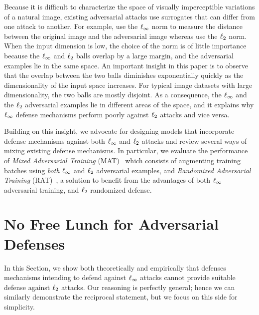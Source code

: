 Because it is difficult to characterize the space of visually imperceptible variations of a natural image, existing adversarial attacks use surrogates that can differ from one attack to another.
For example, \citet{goodfellow2014explaining} use the $\ell_\infty $ norm to measure the distance between the original image and the adversarial image whereas \citet{carlini2017towards} use the $\ell_2 $ norm.
When the input dimension is low, the choice of the norm is of little importance because the $\ell_\infty $ and $\ell_2 $ balls overlap by a large margin, and the adversarial examples lie in the same space.
An important insight in this paper is to observe that the overlap between the two balls  diminishes exponentially quickly as the dimensionality of the input space increases.
For typical image datasets with large dimensionality, the two balls are mostly disjoint.
As a consequence, the $\ell_\infty $ and the $\ell_2 $ adversarial examples lie in different areas of the space, and it explains why $\ell_\infty $ defense mechanisms perform poorly against $\ell_2 $ attacks and vice versa. 

Building on this insight, we advocate for designing models that incorporate defense mechanisms against both $\ell_\infty $ and $\ell_2 $ attacks and review several ways of mixing existing defense mechanisms.
In particular, we evaluate the performance of  {\em Mixed Adversarial Training} (MAT)~\cite{goodfellow2014explaining} which consists of  augmenting training batches using \emph{both} $\ell_\infty $ and $\ell_2 $ adversarial examples, and {\em Randomized Adversarial Training} (RAT)~\cite{salman2019provably}, a solution to benefit from the advantages of both $\ell_\infty $ adversarial training, and $\ell_2 $ randomized defense. 


\section{No Free Lunch for Adversarial Defenses}
\label{section:ap3-no_free_lunch}

In this Section, we show both theoretically and empirically that defenses mechanisms intending to defend against $\ell_\infty $ attacks cannot provide suitable defense against $\ell_2 $ attacks.
Our reasoning is perfectly general; hence we can similarly demonstrate the reciprocal statement, but we focus on this side for simplicity.


